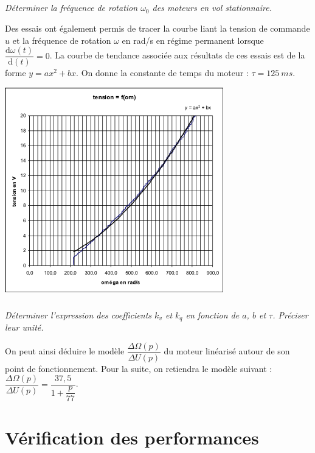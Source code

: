 \documentclass[10pt,fleqn]{article} %
\begin{document}
\begin{multicols}{2}
\subparagraph{}\textit{Déterminer la fréquence de rotation $\omega_0$ des
moteurs en vol stationnaire.}




Des essais ont également permis de tracer la
courbe liant la tension de commande $u$ et la
fréquence de rotation $\omega$ en rad/s en régime
permanent lorsque $\dfrac{\text{d}\omega(t)}{\text{d}(t)}=0$. La courbe de tendance associée aux résultats de
ces essais est de la forme $y=ax^2+bx$. On donne la constante de temps du moteur :
$\tau=\SI{125}{ms}$.

\begin{center}
\includegraphics[width=\linewidth]{images/fig_05}
\end{center}

\subparagraph{}\textit{Déterminer l'expression des coefficients $k_v$ et $k_q$ en fonction de $a$, $b$ et $\tau$. Préciser leur unité.}

On peut ainsi déduire le modèle $\dfrac{\Delta \Omega(p)}{\Delta U(p)}$ du moteur linéarisé autour de son point de fonctionnement. Pour la suite, on retiendra le modèle suivant : $\dfrac{\Delta \Omega(p)}{\Delta U(p)}=\dfrac{37,5}{1+\dfrac{p}{77}}$.

\section*{Vérification des performances}


\end{multicols}
\end{document}
